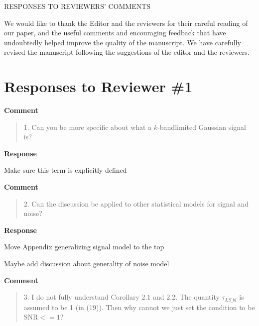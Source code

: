 \documentclass[11pt,onecolumn,journal]{IEEEtran}
\newcommand{\cmark}{\ding{51}}%
\newcommand{\done}{\rlap{$\square$}{\raisebox{2pt}{\large\hspace{1pt}\cmark}}%
\hspace{-2.5pt}}
\begin{document}
\begin{center}
\large RESPONSES TO REVIEWERS' COMMENTS
\end{center}
We would like to thank the Editor and the reviewers for their careful reading of our paper, and the useful comments and encouraging feedback that have undoubtedly helped improve the quality of the manuscript. We have carefully revised the manuscript following the suggestions of the editor and the reviewers. %

\section*{Responses to Reviewer \#1}

\textbf{Comment}
\begin{quote}
1. Can you be more specific about what a $k$-bandlimited Gaussian signal is?
\end{quote}

\textbf{Response}
\begin{todolist}
    \item Make sure this term is explicitly defined
\end{todolist}

\textbf{Comment}
\begin{quote}
2. Can the discussion be applied to other statistical models for signal and noise?
\end{quote}

\textbf{Response}
\begin{todolist}    
\item Move Appendix generalizing signal model to the top
\item Maybe add discussion about generality of noise model
\end{todolist}
\textbf{Comment}
\begin{quote}
3. I do not fully understand Corollary 2.1 and 2.2. The quantity $\tau_{LS\_bl}$ is assumed to be 1 (in (19)). Then why cannot we just set the condition to be $\text{SNR}<=1$?
\end{quote}
\end{document}
